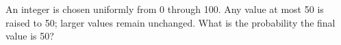 An integer is chosen uniformly from 0 through 100. Any value at most 50 is raised to 50; larger values remain unchanged. What is the probability the final value is 50?
